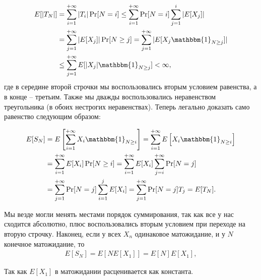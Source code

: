 \documentclass[12pt]{article}
\newcommand\one{\mathbbm{1}}
\begin{document}
\begin{align*}
  E[|T_N|] &= \sum_{i = 1}^{+\infty} |T_i| \Pr[N = i] \le \sum_{i = 1}^{+\infty} \Pr[N = i] \sum_{j = 1}^{i} |E[X_j]| \\
  &= \sum_{j = 1}^{+\infty} |E[X_j]| \Pr[N \ge j]  = \sum_{j = 1}^{+\infty} |E[X_j \one_{N \ge j}]| \\
  &\le \sum_{j = 1}^{+\infty} E[|X_j| \one_{N \ge j}] < \infty,
\end{align*}
где в середине второй строчки мы воспользовались вторым условием равенства, а в конце -- третьим. Также мы дважды воспользовались неравенством треугольника (в обоих нестрогих неравенствах). Теперь легально доказать само равенство следующим образом:

\begin{align*}
  E[S_N] &= E\left[\sum_{i = 1}^{+\infty} X_i \one_{N \ge i}\right] = \sum_{i = 1}^{+\infty} E\left[X_i \one_{N \ge i}\right] \\
  &= \sum_{i = 1}^{+\infty} E[X_i] \Pr[N \ge i] = \sum_{i = 1}^{+\infty} E[X_i] \sum_{j = i}^{+\infty} \Pr[N = j] \\
  &= \sum_{j = 1}^{+\infty} \Pr[N = j] \sum_{i = 1}^j E[X_i] = \sum_{j = 1}^{+\infty} \Pr[N = j] T_j = E[T_N]. 
\end{align*}

Мы везде могли менять местами порядок суммирования, так как все у нас сходится абсолютно, плюс воспользовались вторым условием при переходе на вторую строчку. Наконец, если у всех $X_n$ одинаковое матожидание, и у $N$ конечное матожидание, то
\begin{align*}
  E[S_N] = E[N E[X_1]] = E[N] E[X_1],
\end{align*}

Так как $E[X_1]$ в матожидании расценивается как константа.
\end{document}
